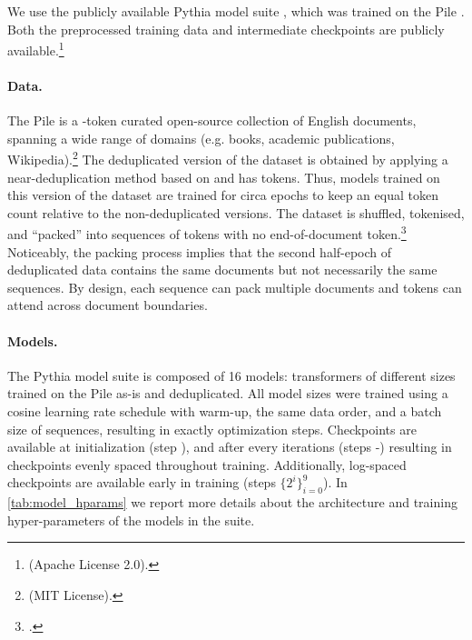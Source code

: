 We use the publicly available Pythia model suite \citep{biderman2023pythia}, which was trained on the Pile \citep{gao2020pile}. Both the preprocessed training data and intermediate checkpoints are publicly available.\footnote{\href{https://github.com/EleutherAI/pythia}{} (Apache License 2.0).} 

\paragraph{Data.}
The Pile is a -token curated open-source collection of English documents, spanning a wide range of domains (e.g. books, academic publications, Wikipedia).\footnote{\href{https://github.com/EleutherAI/the-pile}{} (MIT License).}  
The deduplicated version of the dataset is obtained by applying a near-deduplication method based on  and has  tokens.
Thus, models trained on this version of the dataset are trained for circa  epochs to keep an equal token count relative to the non-deduplicated versions.
The dataset is shuffled, tokenised, and \enquote{packed} into sequences of  tokens with no end-of-document token.\footnote{\href{https://github.com/EleutherAI/pythia/issues/123}{}.}
Noticeably, the packing process implies that the second half-epoch of deduplicated data contains the same documents but not necessarily the same sequences. 
By design, each sequence can pack multiple documents and tokens can attend across document boundaries.

\paragraph{Models.}
The Pythia model suite is composed of 16 models: transformers of  different sizes trained on the Pile as-is and deduplicated.
All model sizes were trained using a cosine learning rate schedule with warm-up, the same data order, and a batch size of  sequences, resulting in exactly  optimization steps.
Checkpoints are available at initialization (step ), and after every  iterations (steps -) resulting in  checkpoints evenly spaced throughout training. 
Additionally, log-spaced checkpoints are available early in training (steps $\{2^i\}_{i=0}^{9}$). In \cref{tab:model_hparams} we report more details about the architecture and training hyper-parameters of the models in the suite.

